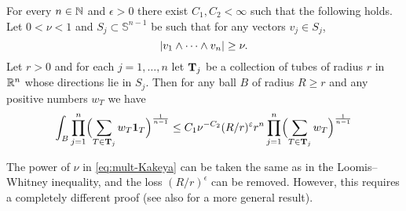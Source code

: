 \begin{theorem}\label{thm:mult-Kakeya}
For every $n\in\mathbb{N}$ and $\epsilon>0$ there exist $C_{1},C_{2}<\infty$ such that the following holds.
Let $0<\nu<1$ and $S_j \subset \mathbb{S}^{n-1}$ be such that for any vectors $v_j \in S_j$,
\[
\lvert v_1 \wedge \dotsb \wedge v_n \rvert \ge \nu.
\]
Let $r>0$ and for each $j=1,\dotsc,n$ let $\mathbf{T}_{j}$ be a collection of tubes of radius $r$ in $\mathbb{R}^n$ whose directions lie in $S_j$.
Then for any ball $B$ of radius $R \geq r$ and any positive numbers $w_{T}$ we have
\begin{equation}\label{eq:mult-Kakeya}
\int_{B} \prod_{j=1}^n \Bigl( \sum_{T \in \mathbf{T}_{j}} w_{T} \mathbf{1}_{T} \Bigr)^{\frac{1}{n-1}}
\le
C_{1} \nu^{-C_{2}} (R/r)^\varepsilon r^{n} \prod_{j=1}^n \Bigl( \sum_{T \in \mathbf{T}_{j}} w_{T} \Bigr)^{\frac{1}{n-1}}
\end{equation}
\end{theorem}

The power of $\nu$ in \eqref{eq:mult-Kakeya} can be taken the same as in the Loomis--Whitney inequality, and the loss $(R/r)^{\epsilon}$ can be removed.
However, this requires a completely different proof \cite{MR2746348} (see also \cite{arxiv:1807.09604} for a more general result).

